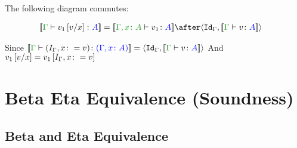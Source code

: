 \documentclass{report}
\begin{document}
The following diagram commutes:
\begin{framed}
    
    \begin{align}
        \deno{\gtyperelation{v_1\ssub{x}{v}}{A}} &= \deno{\typerelation{\gax}{v_1}{A}}\after\pr{\idg}{\deno{\gtyperelation{v}{A}}}
    \end{align}
    
    \centering
\end{framed}


Since $\deno{\gtyperelation{(I_{\G}, x\setto v)}{(\gax)}} = \pr{\idg}{\deno{\gtyperelation{v}{A}}}$
And $v_1\ssub{x}{v} = v_1\sub{I_{\G}, x\setto{v}}$


\chapter{Beta Eta Equivalence (Soundness)}
\section{Beta and Eta Equivalence}
\end{document}
